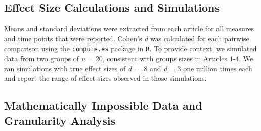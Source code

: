 \documentclass[
  english,
  man, donotrepeattitle,floatsintext]{apa7}
\begin{document}
\hypertarget{effect-size-calculations-and-simulations}{%
\subsection{Effect Size Calculations and Simulations}\label{effect-size-calculations-and-simulations}}

Means and standard deviations were extracted from each article for all measures and time points that were reported. Cohen's \emph{d} was calculated for each pairwise comparison using the \texttt{compute.es} package in \texttt{R}. To provide context, we simulated data from two groups of \emph{n} = 20, consistent with groups sizes in Articles 1-4. We ran simulations with true effect sizes of \emph{d} = .8 and \emph{d} = 3 one million times each and report the range of effect sizes observed in those simulations.

\hypertarget{mathematically-impossible-data-and-granularity-analysis}{%
\subsection{Mathematically Impossible Data and Granularity Analysis}\label{mathematically-impossible-data-and-granularity-analysis}}
\end{document}
